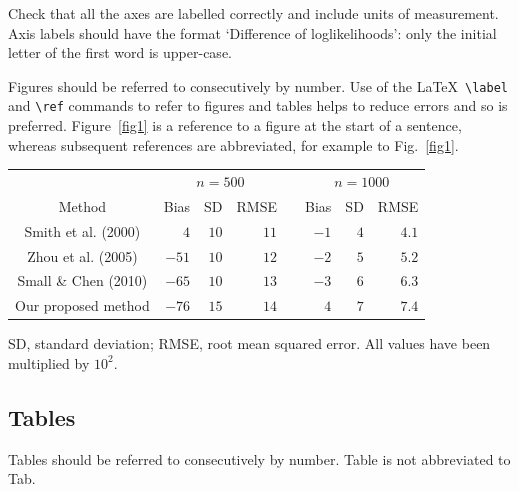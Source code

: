 \documentclass[lineno]{biometrika}
\def\Bka{{\it Biometrika}}
\begin{document}
Check that all the axes are labelled correctly and include units of measurement.  Axis labels should have the format `Difference of loglikelihoods': only the initial letter of the first word is upper-case.




Figures should be referred to consecutively by number. Use of the \LaTeX\ \verb+\label+ and \verb+\ref+ commands to refer to figures and tables helps to reduce errors and so is preferred.  Figure~\ref{fig1}  is a reference to a figure at the start of a sentence, whereas subsequent references are abbreviated, for example to Fig.~\ref{fig1}.


\begin{table}
{	\begin{tabular}{crrrcrrr}
		& \multicolumn{3}{c}{$n=500$} & &\multicolumn{3}{c}{$n=1000$} \\
		Method & Bias & SD & RMSE & &Bias & SD & RMSE \\ 
		Smith et al. (2000) & $4$ & $10$ & $11$& & $-1$ & $4$ & $4.1$\\ 
		Zhou et al. (2005) & $-51$ & $10$ & $12$ &&  $-2$ & $5$ & $5.2$\\ 
		Small \& Chen (2010) & $-65$ & $10$ & $13$ && $-3$ & $6$ & $6.3$\\ 
		Our proposed method & $-76$ & $15$ & $14$ && $4$ & $7$ & $7.4$\\ 
	\end{tabular}}
	\label{tablelabel}
	\begin{tabnote}
	SD, standard deviation; RMSE, root mean squared error. All values have been multiplied by $10^2$.
	\end{tabnote}
	\label{tab2}
\end{table}


\subsection{Tables}

Tables should be referred to consecutively by number. Table is not abbreviated to Tab.
\end{document}
